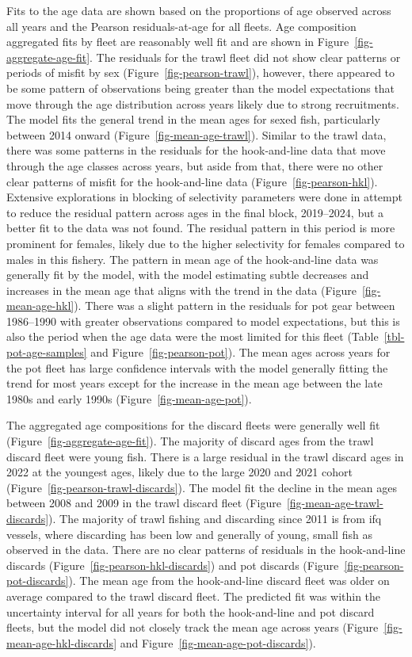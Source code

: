 \documentclass[
  english,
]{article}
\begin{document}
Fits to the age data are shown based on the proportions of age observed
across all years and the Pearson residuals-at-age for all fleets. Age
composition aggregated fits by fleet are reasonably well fit and are
shown in Figure~\ref{fig-aggregate-age-fit}. The residuals for the trawl
fleet did not show clear patterns or periods of misfit by sex
(Figure~\ref{fig-pearson-trawl}), however, there appeared to be some
pattern of observations being greater than the model expectations that
move through the age distribution across years likely due to strong
recruitments. The model fits the general trend in the mean ages for
sexed fish, particularly between 2014 onward
(Figure~\ref{fig-mean-age-trawl}). Similar to the trawl data, there was
some patterns in the residuals for the hook-and-line data that move
through the age classes across years, but aside from that, there were no
other clear patterns of misfit for the hook-and-line data
(Figure~\ref{fig-pearson-hkl}). Extensive explorations in blocking of
selectivity parameters were done in attempt to reduce the residual
pattern across ages in the final block, 2019--2024, but a better fit to
the data was not found. The residual pattern in this period is more
prominent for females, likely due to the higher selectivity for females
compared to males in this fishery. The pattern in mean age of the
hook-and-line data was generally fit by the model, with the model
estimating subtle decreases and increases in the mean age that aligns
with the trend in the data (Figure~\ref{fig-mean-age-hkl}). There was a
slight pattern in the residuals for pot gear between 1986--1990 with
greater observations compared to model expectations, but this is also
the period when the age data were the most limited for this fleet
(Table~\ref{tbl-pot-age-samples} and Figure~\ref{fig-pearson-pot}). The
mean ages across years for the pot fleet has large confidence intervals
with the model generally fitting the trend for most years except for the
increase in the mean age between the late 1980s and early 1990s
(Figure~\ref{fig-mean-age-pot}).

The aggregated age compositions for the discard fleets were generally
well fit (Figure~\ref{fig-aggregate-age-fit}). The majority of discard
ages from the trawl discard fleet were young fish. There is a large
residual in the trawl discard ages in 2022 at the youngest ages, likely
due to the large 2020 and 2021 cohort
(Figure~\ref{fig-pearson-trawl-discards}). The model fit the decline in
the mean ages between 2008 and 2009 in the trawl discard fleet
(Figure~\ref{fig-mean-age-trawl-discards}). The majority of trawl
fishing and discarding since 2011 is from \gls{ifq} vessels, where
discarding has been low and generally of young, small fish as observed
in the data. There are no clear patterns of residuals in the
hook-and-line discards (Figure~\ref{fig-pearson-hkl-discards}) and pot
discards (Figure~\ref{fig-pearson-pot-discards}). The mean age from the
hook-and-line discard fleet was older on average compared to the trawl
discard fleet. The predicted fit was within the uncertainty interval for
all years for both the hook-and-line and pot discard fleets, but the
model did not closely track the mean age across years
(Figure~\ref{fig-mean-age-hkl-discards} and
Figure~\ref{fig-mean-age-pot-discards}).
\end{document}
